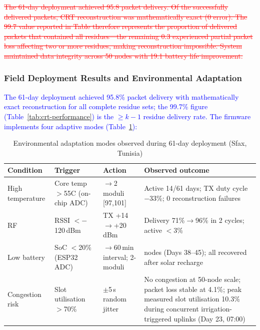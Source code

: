 \documentclass[pdflatex,sn-mathphys-num]{sn-jnl}
\theoremstyle{thmstyleone}
\theoremstyle{thmstyletwo}
\theoremstyle{thmstylethree}
\begin{document}
{\textcolor{red}{\sout{The 61-day deployment achieved 95.8 packet delivery. Of the successfully delivered packets, CRT reconstruction was mathematically exact (0 error). The 99.7 value reported in Table therefore represents the proportion of delivered packets that contained all residues—the remaining 0.3 experienced partial packet loss affecting two or more residues, making reconstruction impossible. System maintained data integrity across 50 nodes with 19.1 battery life improvement.}}
\subsubsection{Field Deployment Results and Environmental Adaptation}
\textcolor{blue}{The 61-day deployment achieved 95.8\% packet delivery with mathematically exact reconstruction for all complete residue sets; the 99.7\% figure (Table~\ref{tab:crt-performance}) is the $\geq k-1$ residue delivery rate. The firmware implements four adaptive modes (Table~\ref{tab:env-adaptation}):}

\begin{table}[htbp]
\centering
\caption{Environmental adaptation modes observed during 61-day deployment (Sfax, Tunisia)}
\label{tab:env-adaptation}
\scriptsize
\setlength{\tabcolsep}{1pt}
\begin{tabularx}{\columnwidth}{>{\raggedright\arraybackslash}p{1.85cm}>{\raggedright\arraybackslash}X>{\raggedright\arraybackslash}X>{\raggedright\arraybackslash}X}
\toprule
\textbf{Condition} & \textbf{Trigger} & \textbf{Action} & \textbf{Observed outcome} \\
\midrule
High temperature & Core temp $>$55\textdegree{}C (on-chip ADC) & 3$\to$2 moduli [97,101] & Active 14/61 days; TX duty cycle $-$33\%; 0 reconstruction failures \\
RF & RSSI $<$$-$120\,dBm & TX +14$\to$+20\,dBm & Delivery 71\%$\to$96\% in 2 cycles; active $<$3\% \\
Low battery & SoC $<$20\% (ESP32 ADC) & 30$\to$60\,min interval; 2-moduli & 3 nodes (Days 38–45); all recovered after solar recharge \\
Congestion risk & Slot utilisation $>$70\% & $\pm$5\,s random jitter & No congestion at 50-node scale; packet loss stable at 4.1\%; peak measured slot utilisation 10.3\% during concurrent irrigation-triggered uplinks (Day 23, 07:00) \\
\bottomrule
\end{tabularx}
\end{table}

}
\end{document}
